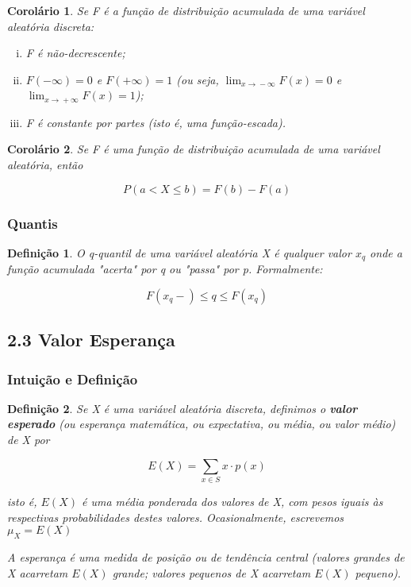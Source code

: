 \documentclass[12pt]{article}
\newtheorem{corollary}{Corolário}[theorem]
\newtheorem{definition}{Definição}
\begin{document}
\begin{corollary}
Se F é a função de distribuição acumulada de uma variável aleatória discreta:

\begin{enumerate}[i.]
    \item F é não-decrescente;
    \item $F(- \infty) = 0$ e $F(+ \infty) = 1$ (ou seja, $\lim_{x\rightarrow{} - \infty} F(x) = 0$ e $\lim_{x\rightarrow{} + \infty} F(x) = 1$);
    \item F é constante por partes (isto é, uma função-escada).
\end{enumerate}
\end{corollary}

\begin{corollary}
Se F é uma função de distribuição acumulada de uma variável aleatória, então

$$P(a < X \leq b) = F(b) - F(a)$$
\end{corollary}

\subsubsection*{Quantis}
\begin{definition}
O q-quantil de uma variável aleatória X é qualquer valor $x_q$ onde a função acumulada "acerta" por q ou "passa" por p. Formalmente:

$$F(x_q -) \leq q \leq F(x_q)$$
\end{definition}

\subsection*{2.3 Valor Esperança}
\subsubsection*{Intuição e Definição}
\begin{definition}
Se X é uma variável aleatória discreta, definimos o \textbf{valor esperado} (ou esperança matemática, ou expectativa, ou média, ou valor médio) de X por

$$E(X) = \sum_{x \in S} x \cdot p(x)$$

isto é, $E(X)$ é uma média ponderada dos valores de X, com pesos iguais às respectivas probabilidades destes valores. Ocasionalmente, escrevemos $\mu_X = E(X)$

A esperança é uma medida de posição ou de tendência central (valores grandes de X acarretam $E(X)$ grande; valores pequenos de X acarretam $E(X)$ pequeno).
\end{definition}
\end{document}
